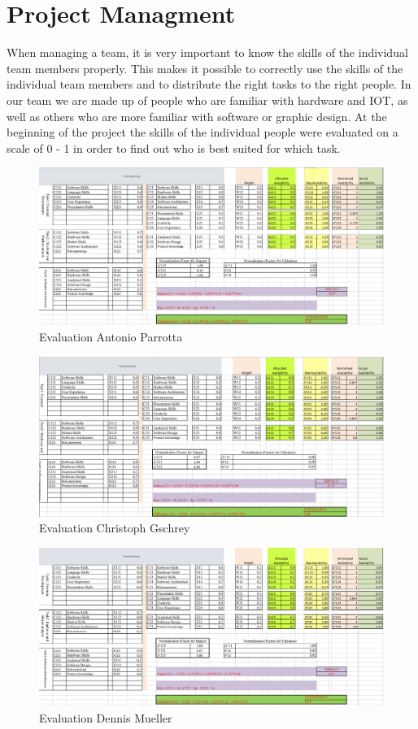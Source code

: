 \section{Project Managment}
When managing a team, it is very important to know the skills of the individual team members properly.
This makes it possible to correctly use the skills of the individual team members and to distribute the right tasks to the right people. In our team we are made up of people who are familiar with hardware and IOT, as well as others who are more familiar with software or graphic design. At the beginning of the project the skills of the individual people were evaluated on a scale of 0 - 1 in order to find out who is best suited for which task.

\begin{figure}[H]
	\centering
	\includegraphics[width =1.05\textwidth]{images/evalTony.png}
	\caption{Evaluation Antonio Parrotta}
\end{figure}

\begin{figure}[H]
	\centering
	\includegraphics[width =1.05\textwidth]{images/evalChris.png}
	\caption{Evaluation Christoph Gschrey}
\end{figure}

\begin{figure}[H]
	\centering
	\includegraphics[width =1.05\textwidth]{images/evalDennis.png}
	\caption{Evaluation Dennis Mueller}
\end{figure}


